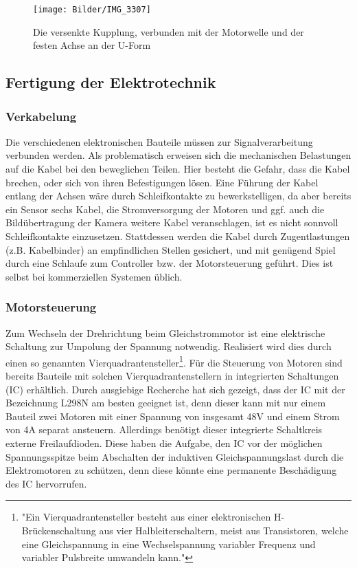 \documentclass[a4paper, 12pt, bibliography=totocnumbered, listof=numbered]{scrartcl}
\begin{document}
	\begin{figure}[htb]
		\centering
		\texttt{[image: Bilder/IMG\_3307]}
		\caption{Die versenkte Kupplung, verbunden mit der Motorwelle und der festen Achse an der U-Form}
	\end{figure}

	\subsection{Fertigung der Elektrotechnik}
	\subsubsection{Verkabelung}
	Die verschiedenen elektronischen Bauteile müssen zur Signalverarbeitung verbunden werden. Als problematisch erweisen sich die mechanischen Belastungen auf die Kabel bei den beweglichen Teilen. Hier besteht die Gefahr, dass die Kabel brechen, oder sich von ihren Befestigungen lösen. Eine Führung der Kabel entlang der Achsen wäre durch Schleifkontakte zu bewerkstelligen, da aber bereits ein Sensor sechs Kabel, die Stromversorgung der Motoren und ggf. auch die Bildübertragung der Kamera weitere Kabel veranschlagen, ist es nicht sonnvoll Schleifkontakte einzusetzen. Stattdessen werden die Kabel durch Zugentlastungen (z.B. Kabelbinder) an empfindlichen Stellen gesichert, und mit genügend Spiel durch eine Schlaufe zum Controller bzw. der Motorsteuerung geführt. Dies ist selbst bei kommerziellen Systemen üblich.

	\subsubsection{Motorsteuerung}
	Zum Wechseln der Drehrichtung beim Gleichstrommotor ist eine elektrische Schaltung zur Umpolung der Spannung notwendig. Realisiert wird dies durch einen so genannten Vierquadrantensteller\footnote{"Ein Vierquadrantensteller besteht aus einer elektronischen H-Brückenschaltung aus vier Halbleiterschaltern, meist aus Transistoren, welche eine Gleichspannung in eine Wechselspannung variabler Frequenz und variabler Pulsbreite umwandeln kann."\cite{wikipedia-hbridge}}\cite{wikipedia-inkrementalgeber}. Für die Steuerung von Motoren sind bereits Bauteile mit solchen Vierquadrantenstellern in integrierten Schaltungen (IC) erhältlich. Durch ausgiebige Recherche hat sich gezeigt, dass der IC mit der Bezeichnung L298N am besten geeignet ist, denn dieser kann mit nur einem Bauteil zwei Motoren mit einer Spannung von insgesamt 48V und einem Strom von 4A separat ansteuern. Allerdings benötigt dieser integrierte Schaltkreis externe Freilaufdioden. Diese haben die Aufgabe, den IC vor der möglichen Spannungsspitze beim Abschalten der induktiven Gleichspannungslast durch die Elektromotoren zu schützen, denn diese könnte eine permanente Beschädigung des IC hervorrufen\cite{wikipedia-schutzdiode}.
\end{document}

